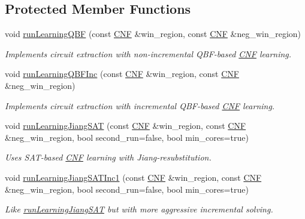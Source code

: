 \subsection*{Protected Member Functions}
\begin{DoxyCompactItemize}
\item 
void \hyperlink{classLearningImplExtractor_a009b5382cc9a65cd7c7dfbbc73815bac}{run\-Learning\-Q\-B\-F} (const \hyperlink{classCNF}{C\-N\-F} \&win\-\_\-region, const \hyperlink{classCNF}{C\-N\-F} \&neg\-\_\-win\-\_\-region)
\begin{DoxyCompactList}\small\item\em Implements circuit extraction with non-\/incremental Q\-B\-F-\/based \hyperlink{classCNF}{C\-N\-F} learning. \end{DoxyCompactList}\item 
void \hyperlink{classLearningImplExtractor_a3edc5671d6f56dea4145512385063681}{run\-Learning\-Q\-B\-F\-Inc} (const \hyperlink{classCNF}{C\-N\-F} \&win\-\_\-region, const \hyperlink{classCNF}{C\-N\-F} \&neg\-\_\-win\-\_\-region)
\begin{DoxyCompactList}\small\item\em Implements circuit extraction with incremental Q\-B\-F-\/based \hyperlink{classCNF}{C\-N\-F} learning. \end{DoxyCompactList}\item 
void \hyperlink{classLearningImplExtractor_a39668b94568dde5459d979684d99253f}{run\-Learning\-Jiang\-S\-A\-T} (const \hyperlink{classCNF}{C\-N\-F} \&win\-\_\-region, const \hyperlink{classCNF}{C\-N\-F} \&neg\-\_\-win\-\_\-region, bool second\-\_\-run=false, bool min\-\_\-cores=true)
\begin{DoxyCompactList}\small\item\em Uses S\-A\-T-\/based \hyperlink{classCNF}{C\-N\-F} learning with Jiang-\/resubstitution. \end{DoxyCompactList}\item 
void \hyperlink{classLearningImplExtractor_a036ab2a3921696d31fb55139427d2114}{run\-Learning\-Jiang\-S\-A\-T\-Inc1} (const \hyperlink{classCNF}{C\-N\-F} \&win\-\_\-region, const \hyperlink{classCNF}{C\-N\-F} \&neg\-\_\-win\-\_\-region, bool second\-\_\-run=false, bool min\-\_\-cores=true)
\begin{DoxyCompactList}\small\item\em Like \hyperlink{classLearningImplExtractor_a39668b94568dde5459d979684d99253f}{run\-Learning\-Jiang\-S\-A\-T} but with more aggressive incremental solving. \end{DoxyCompactList}\item 

\end{DoxyCompactItemize}
